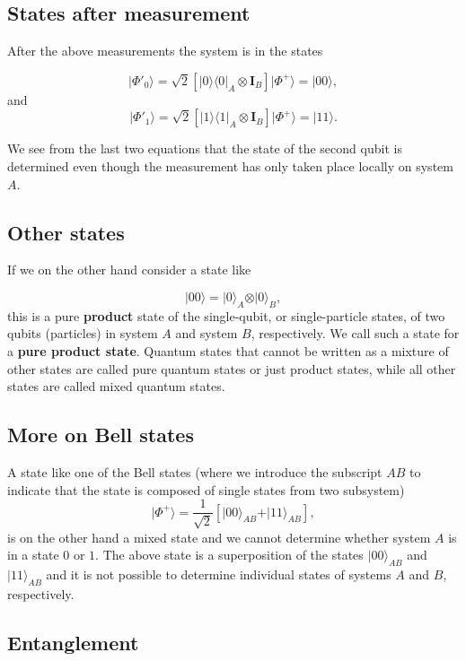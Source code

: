 \subsection{States after measurement}
After the above measurements the system is in the states

\[
\vert \Phi'_0 \rangle = \sqrt{2}\left[\vert 0\rangle\langle 0\vert_A\otimes \bm{I}_B\right]\vert\Phi^+\rangle=\vert 00\rangle,
\]
and 
\[
\vert \Phi'_1 \rangle = \sqrt{2}\left[\vert 1\rangle\langle 1\vert_A\otimes \bm{I}_B\right]\vert\Phi^+\rangle=\vert 11\rangle.
\]

We see from the last two equations that the state of the second qubit
is determined even though the measurement has only taken place locally
on system $A$.

\subsection{Other states}

If we on the other hand consider a state like

\[
\vert 00 \rangle = \vert 0\rangle_A\otimes \vert 0\rangle_B,
\]
this is a pure \textbf{product} state of the single-qubit, or single-particle
states, of two qubits (particles) in system $A$ and system $B$,
respectively. We call such a state for a \textbf{pure product state}.  Quantum states
that cannot be written as a mixture of other states are called pure
quantum states or just product states, while all other states are called mixed quantum states.

\subsection{More on Bell states}
A state like one of the Bell states (where we introduce the subscript $AB$ to indicate that the state is composed of single states from two subsystem)
\[
\vert \Phi^+\rangle = \frac{1}{\sqrt{2}}\left[\vert 00\rangle_{AB} +\vert 11\rangle_{AB}\right],
\]
is on the other hand a mixed state and we cannot determine whether system $A$ is in a state $0$ or $1$. The above state is a superposition of the states $\vert 00\rangle_{AB}$ and $\vert 11\rangle_{AB}$ and it is not possible to determine individual states of systems $A$ and $B$, respectively.

\subsection{Entanglement}


